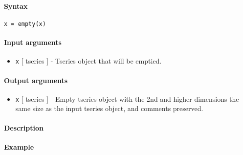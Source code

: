 


	\paragraph{Syntax}\label{syntax}

\begin{verbatim}
x = empty(x)
\end{verbatim}

\paragraph{Input arguments}\label{input-arguments}

\begin{itemize}
\itemsep1pt\parskip0pt
\item
  \texttt{x} {[} tseries {]} - Tseries object that will be emptied.
\end{itemize}

\paragraph{Output arguments}\label{output-arguments}

\begin{itemize}
\itemsep1pt\parskip0pt
\item
  \texttt{x} {[} tseries {]} - Empty tseries object with the 2nd and
  higher dimensions the same size as the input tseries object, and
  comments preserved.
\end{itemize}

\paragraph{Description}\label{description}

\paragraph{Example}\label{example}


